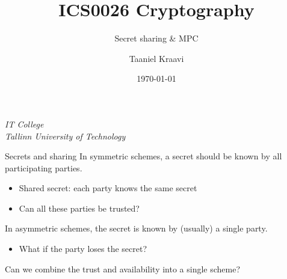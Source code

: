 \usetikzlibrary{positioning,calc}
\graphicspath{ {../../images/} }

\title{ICS0026 Cryptography}
\subtitle{Secret sharing \& MPC}
\date{\today}
\author{Taaniel Kraavi}
\institute%
{%
  \textit{IT College}\\
  \textit{Tallinn University of Technology}
}


\begin{frame}
  \titlepage
\end{frame}

\begin{frame}{Secrets and sharing}
  In symmetric schemes, a secret should be known by all participating parties.
  \begin{itemize}[<+(1)->]
    \item Shared secret: each party knows the same secret
    \item Can all these parties be trusted?
  \end{itemize}

  \vspace*{1em}

  \pause
  In asymmetric schemes, the secret is known by (usually) a single party.
  \begin{itemize}[<+(1)->]
    \item What if the party loses the secret?
  \end{itemize}

  \vspace*{1em}

  \pause
  Can we combine the trust and availability into a single scheme?
\end{frame}

